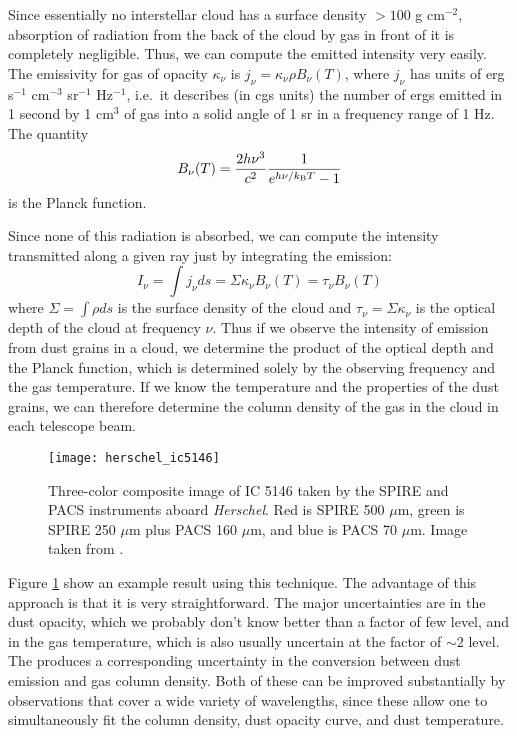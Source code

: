 Since essentially no interstellar cloud has a surface density $> 100$ g cm$^{-2}$, absorption of radiation from the back of the cloud by gas in front of it is completely negligible. Thus, we can compute the emitted intensity very easily. The emissivity for gas of opacity $\kappa_{\nu}$ is $j_{\nu} = \kappa_{\nu} \rho B_{\nu}(T)$, where $j_{\nu}$ has units of erg s$^{-1}$ cm$^{-3}$ sr$^{-1}$ Hz$^{-1}$, i.e.\ it describes (in cgs units) the number of ergs emitted in 1 second by 1 cm$^3$ of gas into a solid angle of 1 sr in a frequency range of 1 Hz. The quantity
\begin{equation}
B_{\nu}(T) = \frac{2 h\nu^3}{c^2} \frac{1}{e^{h\nu/k_{\mathrm{B}} T}-1}
\end{equation}
is the Planck function.
  
Since none of this radiation is absorbed, we can compute the intensity transmitted along a given ray just by integrating the emission: 
  \begin{equation}
  I_{\nu} = \int j_{\nu} ds = \Sigma \kappa_{\nu} B_{\nu}(T) = \tau_{\nu} B_{\nu}(T)
  \end{equation}
where $\Sigma=\int \rho ds$ is the surface density of the cloud and $\tau_{\nu} = \Sigma \kappa_{\nu}$ is the optical depth of the cloud at frequency $\nu$. Thus if we observe the intensity of emission from dust grains in a cloud, we determine the product of the optical depth and the Planck function, which is determined solely by the observing frequency and the gas temperature. If we know the temperature and the properties of the dust grains, we can therefore determine the column density of the gas in the cloud in each telescope beam.

\begin{figure}
\texttt{[image: herschel\_ic5146]}
\caption[\textit{Herschel} map of IC 5146]{
\label{fig:herschel_ic5146}
Three-color composite image of IC 5146 taken by the SPIRE and PACS instruments aboard \textit{Herschel}. Red is SPIRE 500 $\mu$m, green is SPIRE 250 $\mu$m plus PACS 160 $\mu$m, and blue is PACS 70 $\mu$m. Image taken from \citet{arzoumanian11a}.
}
\end{figure}

Figure \ref{fig:herschel_ic5146} show an example result using this technique. The advantage of this approach is that it is very straightforward. The major uncertainties are in the dust opacity, which we probably don't know better than a factor of few level, and in the gas temperature, which is also usually uncertain at the factor of $\sim 2$ level. The produces a corresponding uncertainty in the conversion between dust emission and gas column density. Both of these can be improved substantially by observations that cover a wide variety of wavelengths, since these allow one to simultaneously fit the column density, dust opacity curve, and dust temperature.

